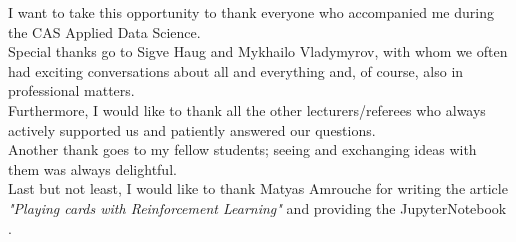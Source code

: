 \documentclass[
11pt, %
oneside, %
english, %
singlespacing, %
liststotoc, %
headsepline, %
chapterinoneline, %
consistentlayout, %
]{MastersDoctoralThesis} %
\begin{document}


\newpage


\begin{acknowledgements}
\addchaptertocentry{\acknowledgementname} %

I want to take this opportunity to thank everyone who accompanied me during the CAS Applied Data Science. \\

\noindent
Special thanks go to Sigve Haug and Mykhailo Vladymyrov, with whom we often had exciting conversations about all and everything and, of course, also in professional matters. \\

\noindent
Furthermore, I would like to thank all the other lecturers/referees who always actively supported us and patiently answered our questions. \\

\noindent
Another thank goes to my fellow students; seeing and exchanging ideas with them was always delightful. \\

\noindent
Last but not least, I would like to thank Matyas Amrouche for writing the article \textit{"Playing cards with Reinforcement Learning"} \cite{easy21} and providing the JupyterNotebook \cite{easy21_explanation}.


\end{acknowledgements}
\newpage





\appendix %




\end{document}
